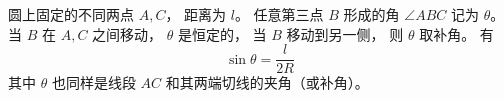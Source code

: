 
\begin{issues}
\issueDraft
\end{issues}

圆上固定的不同两点 $A,C$， 距离为 $l$。 任意第三点 $B$ 形成的角 $\angle ABC$ 记为 $\theta$。 当 $B$ 在 $A,C$ 之间移动， $\theta$ 是恒定的， 当 $B$ 移动到另一侧， 则 $\theta$ 取补角。 有
\begin{equation}\label{SphTri_eq1}
\sin\theta = \frac{l}{2R}
\end{equation}
其中 $\theta$ 也同样是线段 $AC$ 和其两端切线的夹角（或补角）。
